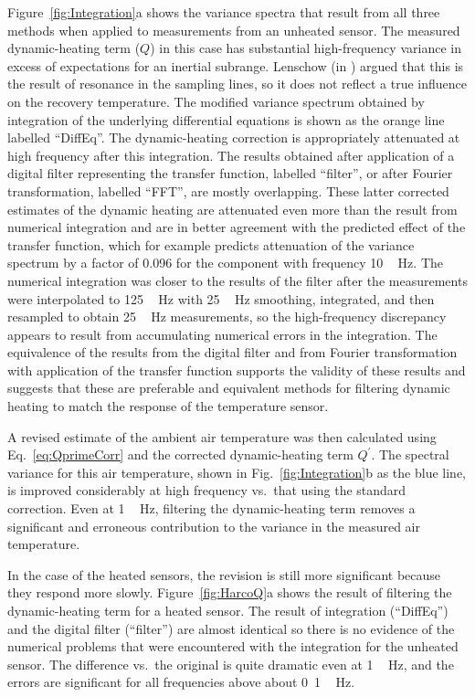 \documentclass[amt, manuscript]{copernicus}
\begin{document}
Figure~\ref{fig:Integration}a shows the variance spectra that result
from all three methods when applied to measurements from an unheated
sensor. The measured dynamic-heating term (\(Q\)) in this case has
substantial high-frequency variance in excess of expectations for an
inertial subrange. Lenschow (in \citet{cooper2016ncartn}) argued that
this is the result of resonance in the sampling lines, so it does not
reflect a true influence on the recovery temperature. The modified
variance spectrum obtained by integration of the underlying differential
equations is shown as the orange line labelled ``DiffEq''. The
dynamic-heating correction is appropriately attenuated at high frequency
after this integration. The results obtained after application of a
digital filter representing the transfer function, labelled ``filter'',
or after Fourier transformation, labelled ``FFT'', are mostly
overlapping. These latter corrected estimates of the dynamic heating are
attenuated even more than the result from numerical integration and are
in better agreement with the predicted effect of the transfer function,
which for example predicts attenuation of the variance spectrum by a
factor of 0.096 for the component with frequency \unit{10\,Hz}. The
numerical integration was closer to the results of the filter after the
measurements were interpolated to \unit{125\,Hz} with \unit{25\,Hz}
smoothing, integrated, and then resampled to obtain \unit{25\,Hz}
measurements, so the high-frequency discrepancy appears to result from
accumulating numerical errors in the integration. The equivalence of the
results from the digital filter and from Fourier transformation with
application of the transfer function supports the validity of these
results and suggests that these are preferable and equivalent methods
for filtering dynamic heating to match the response of the temperature
sensor.

A revised estimate of the ambient air temperature was then calculated
using Eq.~\eqref{eq:QprimeCorr} and the corrected dynamic-heating term
\(Q^{\prime}\). The spectral variance for this air temperature, shown in
Fig.~\ref{fig:Integration}b as the blue line, is improved considerably
at high frequency vs.~that using the standard correction. Even at
\unit{1\,Hz}, filtering the dynamic-heating term removes a significant
and erroneous contribution to the variance in the measured air
temperature.

In the case of the heated sensors, the revision is still more
significant because they respond more slowly. Figure~\ref{fig:HarcoQ}a
shows the result of filtering the dynamic-heating term for a heated
sensor. The result of integration (``DiffEq'') and the digital filter
(``filter'') are almost identical so there is no evidence of the
numerical problems that were encountered with the integration for the
unheated sensor. The difference vs.~the original is quite dramatic even
at \unit{1\,Hz}, and the errors are significant for all frequencies
above about \unit{0.1\,Hz}.
\end{document}
